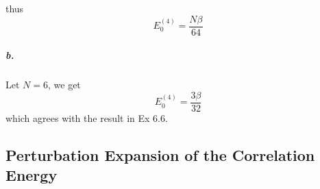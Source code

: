 \documentclass[a4paper]{article}
\newcommand{\subex}[1]{\subparagraph{#1}}
\numberwithin{equation}{subsection}
\begin{document}
thus
\begin{equation}\label{key}
E_0^{(4)} = \dfrac{N\beta}{64}
\end{equation}

\subex{b.}
Let $ N=6 $, we get
\begin{equation}\label{key}
E_0^{(4)} = \dfrac{3\beta}{32}
\end{equation}
which agrees with the result in Ex 6.6.

\subsection{Perturbation Expansion of the Correlation Energy}
\end{document}
